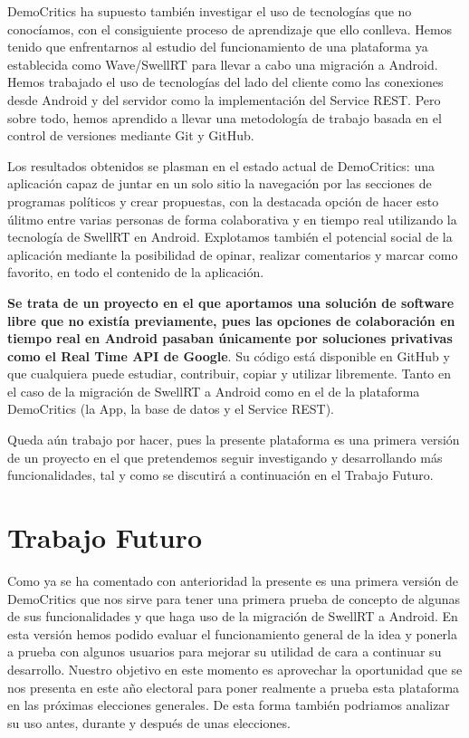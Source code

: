 DemoCritics ha supuesto también investigar el uso de tecnologías que no conocíamos, con el consiguiente proceso de aprendizaje que ello conlleva. Hemos tenido que enfrentarnos al estudio del funcionamiento de una plataforma ya establecida como Wave/SwellRT para llevar a cabo una migración a Android. Hemos trabajado el uso de tecnologías del lado del cliente como las conexiones desde Android y del servidor como la implementación del Service REST. Pero sobre todo, hemos aprendido a llevar una metodología de trabajo basada en el control de versiones mediante Git y GitHub.

Los resultados obtenidos se plasman en el estado actual de DemoCritics: una aplicación capaz de juntar en un solo sitio la navegación por las secciones de programas políticos y crear propuestas, con la destacada opción de hacer esto úlitmo entre varias personas de forma colaborativa y en tiempo real utilizando la tecnología de SwellRT en Android. Explotamos también el potencial social de la aplicación mediante la posibilidad de opinar, realizar comentarios y marcar como favorito, en todo el contenido de la aplicación.

\textbf{Se trata de un proyecto en el que aportamos una solución de software libre  que no existía previamente, pues las opciones de colaboración en tiempo real en Android pasaban únicamente por soluciones privativas como el Real Time API de Google}. Su código está disponible en GitHub y que cualquiera puede estudiar, contribuir, copiar y utilizar libremente. Tanto en el caso de la migración de SwellRT a Android como en el de la plataforma DemoCritics (la App, la base de datos y el Service REST). 

Queda aún trabajo por hacer, pues la presente plataforma es una primera versión de un proyecto en el que pretendemos seguir investigando y desarrollando más funcionalidades, tal y como se discutirá a continuación en el Trabajo Futuro. 

\section{Trabajo Futuro}

Como ya se ha comentado con anterioridad la presente es una primera versión de DemoCritics que nos sirve para tener una primera prueba de concepto de algunas de sus funcionalidades y que haga uso de la migración de SwellRT a Android. En esta versión hemos podido evaluar el funcionamiento general de la idea y ponerla a prueba con algunos usuarios para mejorar su utilidad de cara a continuar su desarrollo. Nuestro objetivo en este momento es aprovechar la oportunidad que se nos presenta en este año electoral para poner realmente a prueba esta plataforma en las próximas elecciones generales. De esta forma también podriamos analizar su uso antes, durante y después de unas elecciones.

